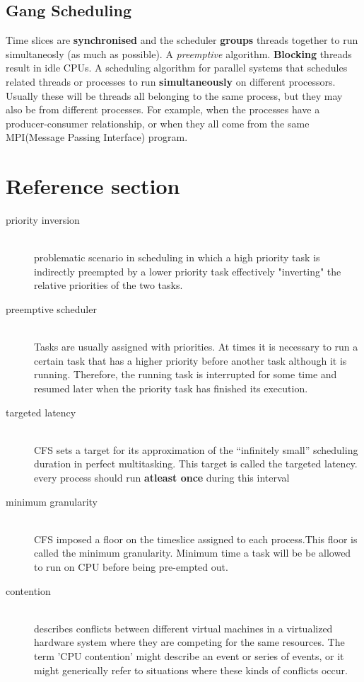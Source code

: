 \documentclass{article}
\begin{document}
\subsection{Gang Scheduling}
\begin{flushleft}
Time slices are \textbf{synchronised} and the scheduler \textbf{groups} threads together to run simultaneosly (as much as possible). A \textit{preemptive} algorithm. \textbf{Blocking} threads result in idle CPUs. A scheduling algorithm for parallel systems that schedules related threads or processes to run \textbf{simultaneously} on different processors. Usually these will be threads all belonging to the same process, but they may also be from different processes. For example, when the processes have a producer-consumer relationship, or when they all come from the same MPI(Message Passing Interface) program.
\end{flushleft}

\pagebreak
\section*{Reference section} \label{sec:reference}
\begin{description}
	\item[priority inversion] \hfill \\ problematic scenario in scheduling in which a high priority task is indirectly preempted by a lower priority task effectively "inverting" the relative priorities of the two tasks.
	\item[preemptive scheduler] \hfill \\ Tasks are usually assigned with priorities. At times it is necessary to run a certain task that has a higher priority before another task although it is running. Therefore, the running task is interrupted for some time and resumed later when the priority task has finished its execution.
	\item[targeted latency] \hfill \\ CFS sets a target for its approximation of the “infinitely small” scheduling duration in perfect multitasking. This target is called the targeted latency. every process should run \textbf{atleast once} during this interval
	\item[minimum granularity] \hfill \\ CFS imposed a floor on the timeslice assigned to each process.This floor is called the minimum granularity. Minimum time a task will be be allowed to run on CPU before being pre-empted out.
	\item[contention] \hfill \\ describes conflicts between different virtual machines in a virtualized hardware system where they are competing for the same resources. The term 'CPU contention’ might describe an event or series of events, or it might generically refer to situations where these kinds of conflicts occur.
\end{description}
\end{document}
